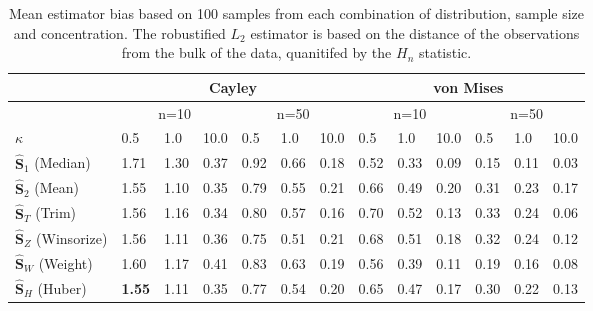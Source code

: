 \documentclass{article}\usepackage[]{graphicx}\usepackage[]{color}
\newcommand{\ProjMean}{{\widehat{\bm S}_{2}}}
\newcommand{\ProjMedian}{{\widehat{\bm S}_{1}}}
\newcommand{\HuberMean}{{\widehat{\bm S}_H}}
\newcommand{\WeightMean}{{\widehat{\bm S}_W}}
\newcommand{\TrimMean}{{\widehat{\bm S}_T}}
\newcommand{\WinzMean}{{\widehat{\bm S}_Z}}
\begin{document}
\begin{table}[ht]
\centering
\begin{tabular}{l|lll|lll|lll|lll}
  \hline
 & \multicolumn{6}{|c|}{Cayley} & \multicolumn{6}{|c}{von Mises}   \\ 
\hline
   &  \multicolumn{3}{|c|}{n=10} & \multicolumn{3}{|c|}{n=50} & \multicolumn{3}{|c|}{n=10} & \multicolumn{3}{|c}{n=50} \\ 
  $\kappa$ &  0.5 &  1.0 & 10.0 &  0.5 &  1.0 & 10.0 &  0.5 &  1.0 & 10.0 &  0.5 &  1.0 & 10.0 \\ \hline
  $\ProjMedian$ (Median) & 1.71 & 1.30 & 0.37 & 0.92 & 0.66 & 0.18 & 0.52 & 0.33 & 0.09 & 0.15 & 0.11 & 0.03 \\ 
  $\ProjMean$ (Mean) & 1.55 & 1.10 & 0.35 & 0.79 & 0.55 & 0.21 & 0.66 & 0.49 & 0.20 & 0.31 & 0.23 & 0.17 \\ 
  $\TrimMean$ (Trim) & 1.56 & 1.16 & 0.34 & 0.80 & 0.57 & 0.16 & 0.70 & 0.52 & 0.13 & 0.33 & 0.24 & 0.06 \\ 
  $\WinzMean$ (Winsorize)& 1.56 & 1.11 & 0.36 & 0.75 & 0.51 & 0.21 & 0.68 & 0.51 & 0.18 & 0.32& 0.24 & 0.12 \\ 
  $\WeightMean$ (Weight) & 1.60 & 1.17 & 0.41 & 0.83 & 0.63 & 0.19 & 0.56 & 0.39 & 0.11 & 0.19 & 0.16 & 0.08 \\ 
  $\HuberMean$ (Huber) & \bf 1.55 & 1.11 & 0.35 & 0.77 & 0.54 & 0.20 & 0.65 & 0.47 & 0.17 & 0.30 & 0.22 & 0.13 \\ 
   \hline
\end{tabular}
\caption{Mean estimator bias based on 100 samples from each combination of distribution, sample size and concentration.  The robustified $L_2$ estimator is based on the distance of the observations from the bulk of the data, quanitifed by the $H_n$ statistic.}
\label{tab:SimResHn}
\end{table}
\end{document}

